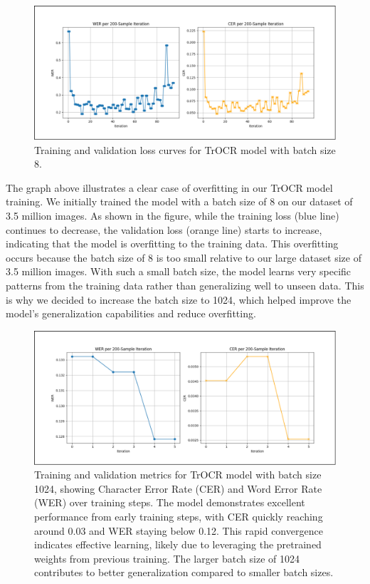 \begin{figure}[ht]
    \centering
    \includegraphics[width=\textwidth]{figures/trocr_overfitting_v1.png}
    \caption{Training and validation loss curves for TrOCR model with batch size 8.}
    \label{fig:trocr-overfitting}
\end{figure}

The graph above illustrates a clear case of overfitting in our TrOCR model training. 
We initially trained the model with a batch size of 8 on our dataset of 3.5 million images. 
As shown in the figure, while the training loss (blue line) continues to decrease, 
the validation loss (orange line) starts to increase, indicating that the model is overfitting 
to the training data. This overfitting occurs because the batch size of 8 is too small relative 
to our large dataset size of 3.5 million images. With such a small batch size, the model learns 
very specific patterns from the training data rather than generalizing well to unseen data. 
This is why we decided to increase the batch size to 1024, which helped improve the model's 
generalization capabilities and reduce overfitting.

\begin{figure}[ht]
    \centering
    \includegraphics[width=\textwidth]{figures/trocr_fine_tuning.png}
    \caption{Training and validation metrics for TrOCR model with batch size 1024, 
    showing Character Error Rate (CER) and Word Error Rate (WER) over training steps. 
    The model demonstrates excellent performance from early training steps, with CER quickly 
    reaching around 0.03 and WER staying below 0.12. This rapid convergence indicates effective 
    learning, likely due to leveraging the pretrained weights from previous training. 
    The larger batch size of 1024 contributes to better generalization compared to smaller batch sizes.}
    \label{fig:trocr-fine-tuning}
\end{figure}

